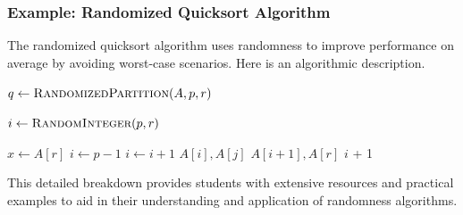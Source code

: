 \documentclass[12pt]{book} %
\begin{document}
\subsubsection*{Example: Randomized Quicksort Algorithm}
The randomized quicksort algorithm uses randomness to improve performance on average by avoiding worst-case scenarios. Here is an algorithmic description.

\begin{algorithm}
\caption{Randomized Quicksort}
\begin{algorithmic}[1]
        \State $q \gets \Call{RandomizedPartition}{A, p, r}$
        \State {}
        \State {}
    \EndIf
\EndProcedure

    \State $i \gets \Call{RandomInteger}{p, r}$
    \State {}
    \State \Return {}
\EndProcedure

    \State $x \gets A[r]$
    \State $i \gets p - 1$
            \State $i \gets i + 1$
            \State {}${A[i], A[j]}$
        \EndIf
    \EndFor
    \State {}${A[i + 1], A[r]}$
    \State \Return $i$ + 1
\EndProcedure
\end{algorithmic}
\end{algorithm}

This detailed breakdown provides students with extensive resources and practical examples to aid in their understanding and application of randomness algorithms.
\end{document}
